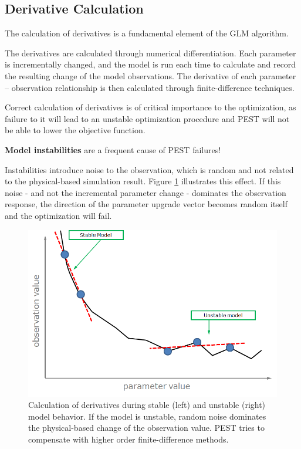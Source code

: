 \subsection{Derivative Calculation}
\label{sec:fepest:derivativeCalculation}

The calculation of derivatives is a fundamental element of the GLM algorithm.

The derivatives are calculated through numerical differentiation. Each parameter is incrementally changed, and the model is run each time to calculate and record the resulting change of the model observations. The derivative of each parameter – observation relationship is then calculated through finite-difference techniques.

Correct calculation of derivatives is of critical importance to the optimization, as failure to it will lead to an unstable optimization procedure and PEST will not be able to lower the objective function.

\textbf{Model instabilities} are a frequent cause of PEST failures!

Instabilities introduce noise to the observation, which is random and not related to the physical-based simulation result. Figure \ref{fig:fepest:ModelGranularity} illustrates this effect. If this noise - and not the incremental parameter change - dominates the observation response, the direction of the parameter upgrade vector becomes random itself and the optimization will fail.

\begin{figure}
	\center
	\includegraphics[width=\columnwidth]{figures/ModelGranularity.png}
\caption{Calculation of derivatives during stable (left) and unstable (right) model behavior. If the model is unstable, random noise dominates the physical-based change of the observation value. PEST tries to compensate with higher order finite-difference methods.}
\label{fig:fepest:ModelGranularity}
\end{figure}

